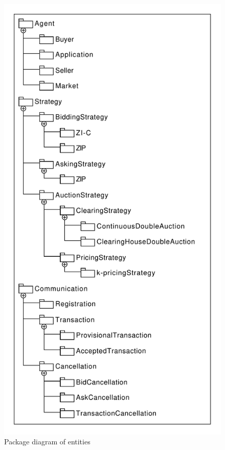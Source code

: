 \documentclass[10pt,journal,compsoc]{IEEEtran}
\begin{document}
\begin{figure}[H]
\centering
\includegraphics[scale=0.4]{drawings/Agent_Package_Diagram.pdf}
\caption{Package diagram of entities \label{fig:package_diagram}}
\end{figure}
\end{document}

